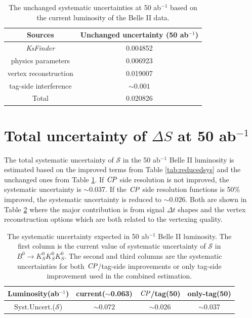 \begin{table}[htpb]
	\centering
	\caption{The unchanged systematic uncertainties at 50 ab$^{-1}$ based on the current luminosity of the Belle II data.}
	\label{tab:unchangedsys}
	\begin{tabular}{c| c}
		\hline
		Sources & Unchanged uncertainty (50 ab$^{-1}$) \\
		\hline
		\textit{KsFinder} & 0.004852\\
		physics parameters &  0.006923 \\
		vertex reconstruction &  0.019007\\
		tag-side interference &  $\sim0.001$\\
		\hline
		Total & 0.020826\\
		\hline
	\end{tabular}
\end{table}

\section{Total uncertainty of $\Delta S$ at 50 ab$^{-1}$}%
The total systematic uncertainty of $\mathcal{S}$ in the 50 ab$^{-1}$ Belle II luminosity is estimated based on the improved terms from Table \ref{tab:reducedsys} and the unchanged ones from Table \ref{tab:unchangedsys}. If $\it{CP}$ side resolution is not improved, the systematic uncertainty is $\sim$0.037. If the $\it{CP}$ side resolution functions is 50\% improved, the systematic uncertainty is reduced to  $\sim0.026$. Both are shown in Table \ref{tab:sys_full} where the major contribution is from signal $\Delta t$ shapes and the vertex reconstruction options which are both related to the vertexing quality. 

\begin{table}[htpb]
	\centering
	\caption{The systematic uncertainty expected in 50 ab$^{-1}$ Belle II luminosity. The first column is the current value of systematic uncertainty of $\mathcal{S}$ in $B^0 \to K_S^0  K_S^0  K_S^0$. The second and third columns are the systematic uncertainties for both $\it{CP}$/tag-side improvements or only tag-side improvement used in the combined estimation.}
	\label{tab:sys_full}
	\begin{tabular}{c| c | c |c}
		\hline
		Luminosity(ab$^{-1}$) & current($\sim$0.063) & $\it{CP}$/tag(50)& only-tag(50)\\
		\hline
		Syst.Uncert.($\mathcal{S}$) & $\sim0.072$ & $\sim$0.026 & $\sim0.037$\\
		\hline
	\end{tabular}
\end{table}


